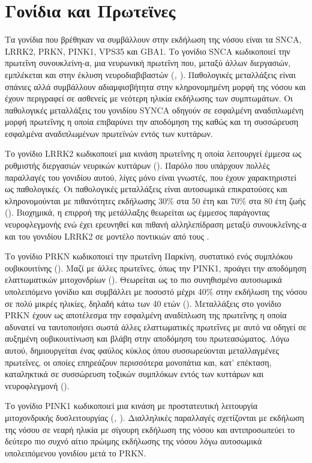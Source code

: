 \documentclass[12pt]{report}
\begin{document}
        \section{Γονίδια και Πρωτεϊνες}
        Τα γονίδια που βρέθηκαν να συμβάλλουν στην εκδήλωση της νόσου είναι τα SNCA, LRRK2, PRKN, PINK1, VPS35 και GBA1. Το γονίδιο SNCA κωδικοποιεί την πρωτεΐνη συνουκλείνη-α, μια νευρωνική πρωτεΐνη που, μεταξύ άλλων διεργασιών, εμπλέκεται και στην έκλυση νευροδιαβιβαστών (\emph{\cite{Trevisan2024GeneticsPerspectives}, \cite{Jankovic2020ParkinsonsTreatment}}). Παθολογικές μεταλλάξεις είναι σπάνιες αλλά συμβάλλουν αδιαμφισβήτητα στην κληρονομημένη μορφή της νόσου και έχουν περιγραφεί σε ασθενείς με νεότερη ηλικία εκδήλωσης των συμπτωμάτων. Οι παθολογικές μεταλλάξεις του γονιδίου SYNCA οδηγούν σε εσφαλμένη αναδιπλωμένη μορφή πρωτεΐνης η οποία επιβαρύνει την αποδόμηση της καθώς και τη συσσώρευση εσφαλμένα αναδιπλωμένων πρωτεϊνών εντός των κυττάρων.
        \par
        Το γονίδιο LRRK2  κωδικοποιεί μια κινάση πρωτεΐνης η οποία λειτουργεί έμμεσα ως ρυθμιστής διεργασιών νευρικών κυττάρων (\emph{\cite{Trevisan2024GeneticsPerspectives}}). Παρόλο που υπάρχουν πολλές παραλλαγές του γονιδίου αυτού, λίγες μόνο είναι γνωστές, που έχουν χαρακτηριστεί ως παθολογικές. Οι παθολογικές μεταλλάξεις είναι αυτοσωμικά επικρατούσες και κληρονομούνται με πιθανότητες εκδήλωσης 30\% στα 50 έτη και 70\% στα 80 έτη ζωής (\emph{\cite{Healy2008PhenotypeStudy}}). Βιοχημικά, η επιρροή της μετάλλαξης θεωρείται ως έμμεσος παράγοντας νευροφλεγμονής ενώ έχει ερευνηθεί και πιθανή αλληλεπίδραση μεταξύ συνουκλεΐνης-α και του γονιδίου LRRK2 σε μοντέλο ποντικιών από τους \cite{Bieri2019LRRK2Neurons}.
        \par
        Το γονίδιο PRKN κωδικοποιεί την πρωτεΐνη Παρκίνη, συστατικό ενός συμπλόκου ουβικουιτίνης (\emph{\cite{Trevisan2024GeneticsPerspectives}}). Μαζί με άλλες πρωτεΐνες, όπως την PINK1, προάγει την αποδόμηση ελαττωματικών μιτοχονδρίων (\emph{\cite{Yoshino2022Genotype-phenotypeVariants}}). Θεωρείται ως το πιο συνηθισμένο αυτοσωμικά υπολειπόμενο γονίδιο και συμβάλλει με ποσοστό μέχρι 40\% στην εκδήλωση της νόσου σε πολύ μικρές ηλικίες, δηλαδή κάτω των 40 ετών (\emph{\cite{Wasner2022ParkinInflammation}}). Μεταλλάξεις στο γονίδιο PRKN έχουν ως αποτέλεσμα την εσφαλμένη αναδίπλωση της πρωτεΐνης η οποία αδυνατεί να ταυτοποιήσει σωστά άλλες ελαττωματικές πρωτεΐνες με αυτό να οδηγεί σε αυξημένη ουβικουιτίνωση και βλάβη στην αποδόμηση του πρωτεασώματος. Λόγω αυτού, δημιουργείται ένας φαύλος κύκλος όπου συσσωρεύονται μεταλλαγμένες πρωτεΐνες, οι οποίες επηρεάζουν περισσότερα μονοπάτια και, κατ' επέκταση, καταληκτικά σε συσσώρευση τοξικών συμπλόκων εντός των κυττάρων και νευροφλεγμονή (\emph{\cite{Jankovic2020ParkinsonsTreatment}}).
        \par
        Το γονίδιο PINK1 κωδικοποιεί μια κινάση με προστατευτική λειτουργία μιτοχονδρικής δυσλειτουργίας (\emph{\cite{Trevisan2024GeneticsPerspectives}, \cite{Lucking2000Gene}}). Διαλληλικές παραλλαγές σχετίζονται με εκδήλωση της νόσου σε νεαρή ηλικία με σίγουρη εκδήλωση της νόσου και αντιπροσωπεύει το δεύτερο πιο συχνό αίτιο πρώιμης εκδήλωσης της νόσου λόγω αυτοσωμικά υπολειπόμενου γονιδίου μετά το PRKN.
        
\end{document}
